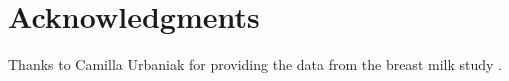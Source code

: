\documentclass[10pt,letterpaper]{article}
\begin{document}
\section*{Acknowledgments}
Thanks to Camilla Urbaniak for providing the data from the breast milk study \cite{urbaniak2016human}.

\nolinenumbers

%
%
% 

\end{document}
